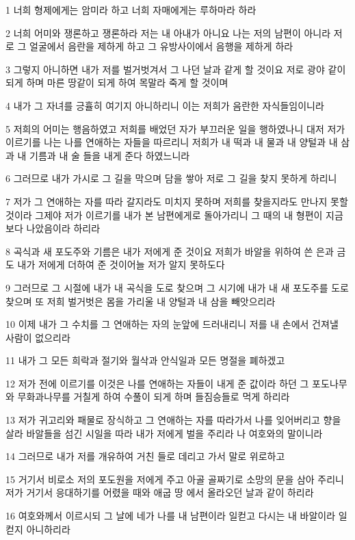 \par 1 너희 형제에게는 암미라 하고 너희 자매에게는 루하마라 하라
\par 2 너희 어미와 쟁론하고 쟁론하라 저는 내 아내가 아니요 나는 저의 남편이 아니라 저로 그 얼굴에서 음란을 제하게 하고 그 유방사이에서 음행을 제하게 하라
\par 3 그렇지 아니하면 내가 저를 벌거벗겨서 그 나던 날과 같게 할 것이요 저로 광야 같이 되게 하며 마른 땅같이 되게 하여 목말라 죽게 할 것이며
\par 4 내가 그 자녀를 긍휼히 여기지 아니하리니 이는 저희가 음란한 자식들임이니라
\par 5 저희의 어미는 행음하였고 저희를 배었던 자가 부끄러운 일을 행하였나니 대저 저가 이르기를 나는 나를 연애하는 자들을 따르리니 저희가 내 떡과 내 물과 내 양털과 내 삼과 내 기름과 내 술 들을 내게 준다 하였느니라
\par 6 그러므로 내가 가시로 그 길을 막으며 담을 쌓아 저로 그 길을 찾지 못하게 하리니
\par 7 저가 그 연애하는 자를 따라 갈지라도 미치지 못하며 저희를 찾을지라도 만나지 못할 것이라 그제야 저가 이르기를 내가 본 남편에게로 돌아가리니 그 때의 내 형편이 지금보다 나았음이라 하리라
\par 8 곡식과 새 포도주와 기름은 내가 저에게 준 것이요 저희가 바알을 위하여 쓴 은과 금도 내가 저에게 더하여 준 것이어늘 저가 알지 못하도다
\par 9 그러므로 그 시절에 내가 내 곡식을 도로 찾으며 그 시기에 내가 내 새 포도주를 도로 찾으며 또 저희 벌거벗은 몸을 가리울 내 양털과 내 삼을 빼앗으리라
\par 10 이제 내가 그 수치를 그 연애하는 자의 눈앞에 드러내리니 저를 내 손에서 건져낼 사람이 없으리라
\par 11 내가 그 모든 희락과 절기와 월삭과 안식일과 모든 명절을 폐하겠고
\par 12 저가 전에 이르기를 이것은 나를 연애하는 자들이 내게 준 값이라 하던 그 포도나무와 무화과나무를 거칠게 하여 수풀이 되게 하며 들짐승들로 먹게 하리라
\par 13 저가 귀고리와 패물로 장식하고 그 연애하는 자를 따라가서 나를 잊어버리고 향을 살라 바알들을 섬긴 시일을 따라 내가 저에게 벌을 주리라 나 여호와의 말이니라
\par 14 그러므로 내가 저를 개유하여 거친 들로 데리고 가서 말로 위로하고
\par 15 거기서 비로소 저의 포도원을 저에게 주고 아골 골짜기로 소망의 문을 삼아 주리니 저가 거기서 응대하기를 어렸을 때와 애굽 땅 에서 올라오던 날과 같이 하리라
\par 16 여호와께서 이르시되 그 날에 네가 나를 내 남편이라 일컫고 다시는 내 바알이라 일컫지 아니하리라
